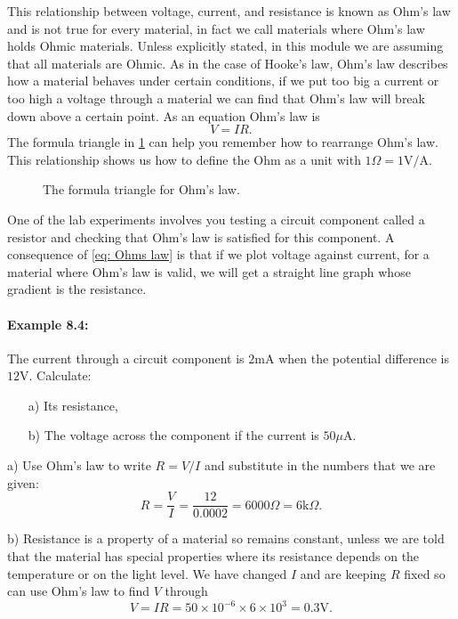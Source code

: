 \documentclass[a4paper,12pt]{book}
\begin{document}
This relationship between voltage, current, and resistance is known as Ohm's law and is not true for every material, in fact we call materials where Ohm's law holds Ohmic materials. Unless explicitly stated, in this module we are assuming that all materials are Ohmic. As in the case of Hooke's law, Ohm's law describes how a material behaves under certain conditions, if we put too big a current or too high a voltage through a material we can find that Ohm's law will break down above a certain point. As an equation Ohm's law is
\begin{equation}
V=IR.
\label{eq: Ohms law}
\end{equation}
The formula triangle in \cref{fig: Ohms law} can help you remember how to rearrange Ohm's law. This relationship shows us how to define the Ohm as a unit with $1\Omega=1\text{V/A}$.

\begin{figure}[ht]
    \centering
   \large {}
    \caption{The formula triangle for Ohm's law. }
    \label{fig: Ohms law}
\end{figure}

One of the lab experiments involves you testing a circuit component called a resistor and checking that Ohm's law is satisfied for this component. A consequence of \cref{eq: Ohms law} is that if we plot voltage against current, for a material where Ohm's law is valid, we will get a straight line graph whose gradient is the resistance.

\paragraph{Example 8.4:} The current through a circuit component is $2\text{mA}$ when the potential difference is $12\text{V}$. Calculate:
\begin{itemize}
\setlength{\itemsep}{-5pt}
    \item[a)] Its resistance,
    \item[b)] The voltage across the component if the current is $50\mu\text{A}$.
\end{itemize}

a) Use Ohm's law to write $R=V/I$ and substitute in the numbers that we are given:
\begin{equation*}
R=\frac{V}{I}=\frac{12}{0.0002}=6000\Omega = 6\text{k}\Omega.
\end{equation*}

b) Resistance is a property of a material so remains constant, unless we are told that the material has special properties where its resistance depends on the temperature or on the light level. We have changed $I$ and are keeping $R$ fixed so can use Ohm's law to find $V$ through
\begin{equation*}
V=IR=50\times10^{-6}\times 6\times 10^{3}=0.3\text{V}.
\end{equation*}
\end{document}
